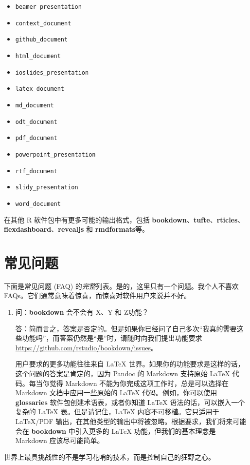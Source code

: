 \documentclass[
  12pt,
]{krantz}
\providecommand{\tightlist}{%
  \setlength{\itemsep}{0pt}\setlength{\parskip}{0pt}}
\theoremstyle{definition}
\theoremstyle{definition}
\theoremstyle{definition}
\theoremstyle{definition}
\theoremstyle{remark}
\begin{document}
\begin{itemize}
\tightlist
\item
  \texttt{beamer\_presentation}
\item
  \texttt{context\_document}
\item
  \texttt{github\_document}
\item
  \texttt{html\_document}
\item
  \texttt{ioslides\_presentation}
\item
  \texttt{latex\_document}
\item
  \texttt{md\_document}
\item
  \texttt{odt\_document}
\item
  \texttt{pdf\_document}
\item
  \texttt{powerpoint\_presentation}
\item
  \texttt{rtf\_document}
\item
  \texttt{slidy\_presentation}
\item
  \texttt{word\_document}
\end{itemize}

在其他 R 软件包中有更多可能的输出格式，包括 \textbf{bookdown}、\textbf{tufte}、\textbf{rticles}、\textbf{flexdashboard}、\textbf{revealjs} 和 \textbf{rmdformats}等。

\hypertarget{ux5e38ux89c1ux95eeux9898}{%
\chapter{常见问题}\label{ux5e38ux89c1ux95eeux9898}}

下面是常见问题 (FAQ) 的\emph{完整}列表。是的，这里只有一个问题。我个人不喜欢 FAQs。它们通常意味着惊喜，而惊喜对软件用户来说并不好。

\begin{enumerate}
\def\labelenumi{\arabic{enumi}.}
\item
  问：\textbf{bookdown} 会不会有 X、Y 和 Z功能？

  答：简而言之，答案是否定的。但是如果你已经问了自己多次``我真的需要这些功能吗''，而答案仍然是``是''时，请随时向我们提出功能要求 \url{https://github.com/rstudio/bookdown/issues}。

  用户要求的更多功能往往来自 LaTeX 世界。如果你的功能要求是这样的话，这个问题的答案是肯定的，因为 Pandoc 的 Markdown 支持原始 LaTeX 代码。每当你觉得 Markdown 不能为你完成这项工作时，总是可以选择在 Markdown 文档中应用一些原始的 LaTeX 代码。例如，你可以使用 \textbf{glossaries} 软件包创建术语表，或者你知道 LaTeX 语法的话，可以嵌入一个复杂的 LaTeX 表。但是请记住，LaTeX 内容不可移植。它只适用于 LaTeX/PDF 输出，在其他类型的输出中将被忽略。根据要求，我们将来可能会在 \textbf{bookdown} 中引入更多的 LaTeX 功能，但我们的基本理念是 Markdown 应该尽可能简单。
\end{enumerate}

世界上最具挑战性的不是学习花哨的技术，而是控制自己的狂野之心。

\backmatter

  

\printindex
\end{document}
